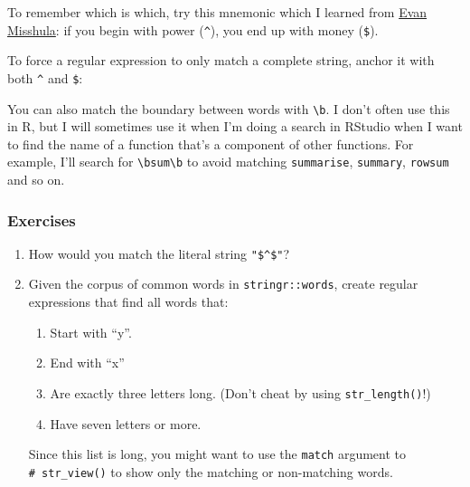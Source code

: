 \documentclass[]{book}
\newenvironment{Shaded}{\begin{snugshade}}{\end{snugshade}}
\newcommand{\KeywordTok}[1]{\textcolor[rgb]{0.13,0.29,0.53}{\textbf{{#1}}}}
\newcommand{\StringTok}[1]{\textcolor[rgb]{0.31,0.60,0.02}{{#1}}}
\newcommand{\CommentTok}[1]{\textcolor[rgb]{0.56,0.35,0.01}{\textit{{#1}}}}
\newcommand{\NormalTok}[1]{{#1}}
\providecommand{\tightlist}{%
  \setlength{\itemsep}{0pt}\setlength{\parskip}{0pt}}
\begin{document}
\begin{Shaded}
\end{Shaded}

To remember which is which, try this mnemonic which I learned from
\href{https://twitter.com/emisshula/status/323863393167613953}{Evan
Misshula}: if you begin with power (\texttt{\^{}}), you end up with
money (\texttt{\$}).

To force a regular expression to only match a complete string, anchor it
with both \texttt{\^{}} and \texttt{\$}:

\begin{Shaded}
\end{Shaded}

You can also match the boundary between words with
\texttt{\textbackslash{}b}. I don't often use this in R, but I will
sometimes use it when I'm doing a search in RStudio when I want to find
the name of a function that's a component of other functions. For
example, I'll search for \texttt{\textbackslash{}bsum\textbackslash{}b}
to avoid matching \texttt{summarise}, \texttt{summary}, \texttt{rowsum}
and so on.

\subsubsection{Exercises}\label{exercises-32}

\begin{enumerate}
\def\labelenumi{\arabic{enumi}.}
\item
  How would you match the literal string \texttt{"\$\^{}\$"}?
\item
  Given the corpus of common words in \texttt{stringr::words}, create
  regular expressions that find all words that:

  \begin{enumerate}
  \def\labelenumii{\arabic{enumii}.}
  \tightlist
  \item
    Start with ``y''.
  \item
    End with ``x''
  \item
    Are exactly three letters long. (Don't cheat by using
    \texttt{str\_length()}!)
  \item
    Have seven letters or more.
  \end{enumerate}

  Since this list is long, you might want to use the \texttt{match}
  argument to \texttt{\#\ str\_view()} to show only the matching or
  non-matching words.
\end{enumerate}
\end{document}
